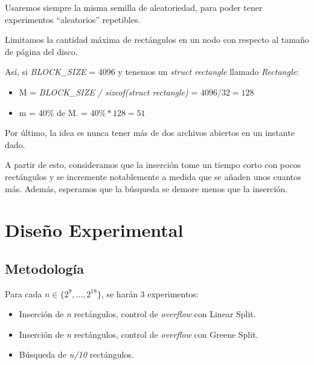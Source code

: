 \documentclass[letterpaper,10pt]{article}
\begin{document}
	Usaremos siempre la misma semilla de aleatoriedad, para poder tener experimentos ``aleatorios'' repetibles.

	Limitamos la cantidad máxima de rectángulos en un nodo con respecto al tamaño de página del disco.

	Así, si \textit{BLOCK\_SIZE} = 4096 y tenemos un \textit{struct rectangle} llamado \textit{Rectangle}:

	\begin{itemize}
		\item M = \textit{BLOCK\_SIZE / sizeof(struct rectangle)} = $ 4096 / 32 = 128 $
		\item m = 40\% de M. = $ 40\% * 128 = 51 $
	\end{itemize}

	Por último, la idea es nunca tener más de dos archivos abiertos en un instante dado.

	A partir de esto, consideramos que la inserción tome un tiempo corto con pocos rectángulos y se incremente notablemente a medida que se añaden unos cuantos más.
	Además, esperamos que la búsqueda se demore menos que la inserción.

	\newpage

	\section{Diseño Experimental}

	\subsection{Metodología}

	Para cada $n \in \{2^{9}, ..., 2^{18}\}$, se harán 3 experimentos:

	\begin{itemize}
		\item Inserción de \textit{n} rectángulos, control de \textit{overflow} con Linear Split.
		\item Inserción de \textit{n} rectángulos, control de \textit{overflow} con Greene Split.
		\item Búsqueda de \textit{n/10} rectángulos.
	\end{itemize}
\end{document}
